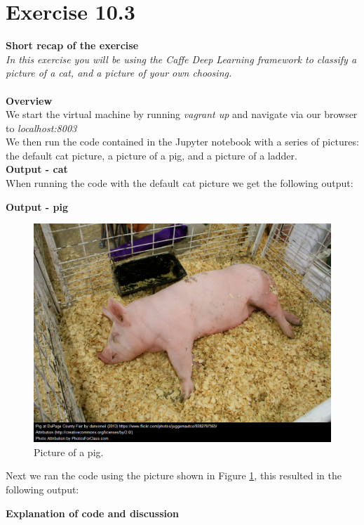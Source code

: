 \documentclass{article}
\begin{document}
\section{Exercise 10.3}
\textbf{Short recap of the exercise}\\
\textit{In this exercise you will be using the Caffe Deep Learning framework to classify a picture of a cat, and a picture of your own choosing.}\\
~\\
\textbf{Overview}\\
We start the virtual machine by running \textit{vagrant up} and navigate via our browser to \textit{localhost:8003}\\
We then run the code contained in the Jupyter notebook with a series of pictures: the default cat picture, a picture of a pig, and a picture of a ladder.
~\\
\textbf{Output - cat}\\
When running the code with the default cat picture we get the following output:
\textbf{Output - pig}
\begin{figure}[h!]
\begin{center}
\caption{Picture of a pig.}
\label{fig:pig}
\includegraphics[scale=0.2]{"../Lesson 10/images/pig"}
\end{center}
\end{figure}
Next we ran the code using the picture shown in Figure \ref{fig:pig}, this resulted in the following output:
\textbf{Explanation of code and discussion}\\
\end{document}
